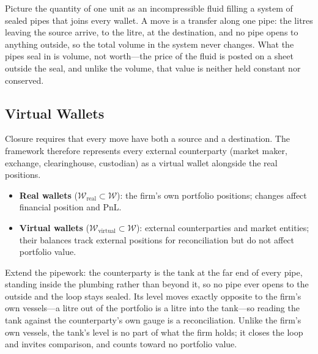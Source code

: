 \begin{mentalmodel}
Picture the quantity of one unit as an incompressible fluid filling a system of sealed pipes that joins every wallet. A move is a transfer along one pipe: the litres leaving the source arrive, to the litre, at the destination, and no pipe opens to anything outside, so the total volume in the system never changes. What the pipes seal in is volume, not worth---the price of the fluid is posted on a sheet outside the seal, and unlike the volume, that value is neither held constant nor conserved.
\end{mentalmodel}


\subsection{Virtual Wallets}

Closure requires that every move have both a source and a destination. The framework therefore represents every external counterparty (market maker, exchange, clearinghouse, custodian) as a virtual wallet alongside the real positions.

\begin{definition}\hfill
\begin{itemize}[nosep]
\item \textbf{Real wallets} ($\mathcal{W}_{\mathrm{real}} \subset \mathcal{W}$): the firm's own portfolio positions; changes affect financial position and PnL.
\item \textbf{Virtual wallets} ($\mathcal{W}_{\mathrm{virtual}} \subset \mathcal{W}$): external counterparties and market entities; their balances track external positions for reconciliation but do not affect portfolio value.
\end{itemize}
\end{definition}

\begin{mentalmodel}
Extend the pipework: the counterparty is the tank at the far end of every pipe, standing inside the plumbing rather than beyond it, so no pipe ever opens to the outside and the loop stays sealed. Its level moves exactly opposite to the firm's own vessels---a litre out of the portfolio is a litre into the tank---so reading the tank against the counterparty's own gauge is a reconciliation. Unlike the firm's own vessels, the tank's level is no part of what the firm holds; it closes the loop and invites comparison, and counts toward no portfolio value.
\end{mentalmodel}

